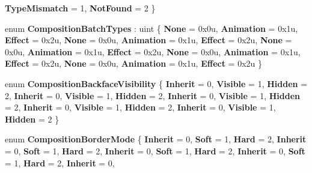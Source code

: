 \begin{DoxyCompactItemize}
{\bfseries Type\+Mismatch} = 1, 
{\bfseries Not\+Found} = 2
 \}
\item 
\mbox{\label{namespace_windows_1_1_u_i_1_1_composition_aee18d765e5fb2f69e4c1656c628cd576}} 
enum {\bfseries Composition\+Batch\+Types} \+: uint \{ \newline
{\bfseries None} = 0x0u, 
{\bfseries Animation} = 0x1u, 
{\bfseries Effect} = 0x2u, 
{\bfseries None} = 0x0u, 
\newline
{\bfseries Animation} = 0x1u, 
{\bfseries Effect} = 0x2u, 
{\bfseries None} = 0x0u, 
{\bfseries Animation} = 0x1u, 
\newline
{\bfseries Effect} = 0x2u, 
{\bfseries None} = 0x0u, 
{\bfseries Animation} = 0x1u, 
{\bfseries Effect} = 0x2u, 
\newline
{\bfseries None} = 0x0u, 
{\bfseries Animation} = 0x1u, 
{\bfseries Effect} = 0x2u
 \}
\item 
\mbox{\label{namespace_windows_1_1_u_i_1_1_composition_a2208fe30c093609e4c2f6f06851913d2}} 
enum {\bfseries Composition\+Backface\+Visibility} \{ \newline
{\bfseries Inherit} = 0, 
{\bfseries Visible} = 1, 
{\bfseries Hidden} = 2, 
{\bfseries Inherit} = 0, 
\newline
{\bfseries Visible} = 1, 
{\bfseries Hidden} = 2, 
{\bfseries Inherit} = 0, 
{\bfseries Visible} = 1, 
\newline
{\bfseries Hidden} = 2, 
{\bfseries Inherit} = 0, 
{\bfseries Visible} = 1, 
{\bfseries Hidden} = 2, 
\newline
{\bfseries Inherit} = 0, 
{\bfseries Visible} = 1, 
{\bfseries Hidden} = 2
 \}
\item 
\mbox{\label{namespace_windows_1_1_u_i_1_1_composition_ad094aac2d72715708083e1a34f7835f0}} 
enum {\bfseries Composition\+Border\+Mode} \{ \newline
{\bfseries Inherit} = 0, 
{\bfseries Soft} = 1, 
{\bfseries Hard} = 2, 
{\bfseries Inherit} = 0, 
\newline
{\bfseries Soft} = 1, 
{\bfseries Hard} = 2, 
{\bfseries Inherit} = 0, 
{\bfseries Soft} = 1, 
\newline
{\bfseries Hard} = 2, 
{\bfseries Inherit} = 0, 
{\bfseries Soft} = 1, 
{\bfseries Hard} = 2, 
\newline
{\bfseries Inherit} = 0, 

\end{DoxyCompactItemize}
